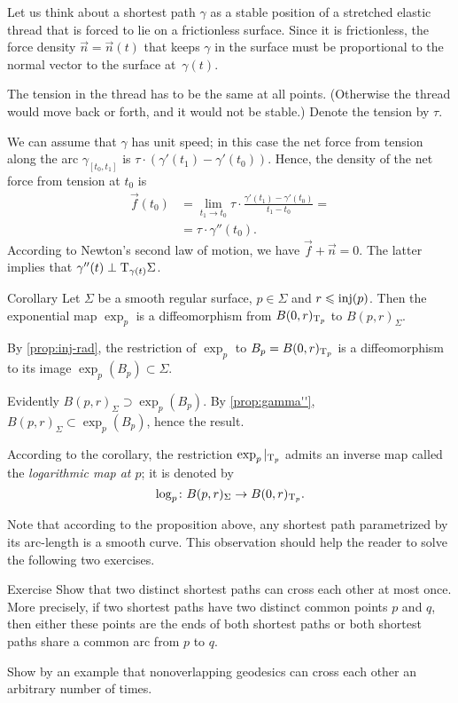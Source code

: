 Let us think about a shortest path $\gamma$ as a stable position of a stretched elastic thread that is forced to lie on a frictionless surface.
Since it is frictionless, the force density $\vec n=\vec n(t)$ that keeps $\gamma$ in the surface must be proportional to the normal vector to the surface at~$\gamma(t)$.

The tension in the thread has to be the same at all points. (Otherwise the thread would move back or forth, and it would not be stable.)
Denote the tension by $\tau$.

We can assume that $\gamma$ has unit speed;
in this case the net force from tension along the arc $\gamma_{[t_0,t_1]}$ is $\tau\cdot(\gamma'(t_1)-\gamma'(t_0))$.
Hence, the density of the net force from tension at $t_0$ is 
\begin{align*}
\vec f(t_0)&=\lim_{t_1\to t_0}\tau\cdot\frac{\gamma'(t_1)-\gamma'(t_0)}{t_1-t_0}=
\\
&=\tau\cdot\gamma''(t_0).
\end{align*}
According to Newton's second law of motion, we have 
$\vec f+\vec n=0$.
The latter implies that $\gamma''(t)\perp\mathrm{T}_{\gamma(t)}\Sigma$.
\qeds

\begin{thm}{Corollary}
Let $\Sigma$ be a smooth regular surface, $p\in\Sigma$ and $r\z\le \inj(p)$.
Then the exponential map $\exp_p$ is a diffeomorphism from $B(0,r)_{\mathrm{T}_p}$ to $B(p,r)_\Sigma$.
\end{thm}

By \ref{prop:inj-rad}, the restriction of $\exp_p$ to $B_p={B(0,r)_{\mathrm{T}_p}}$ is a diffeomorphism to its image $\exp_p(B_p)\subset \Sigma$.

Evidently $B(p,r)_\Sigma\supset\exp_p(B_p)$.
By \ref{prop:gamma''}, $B(p,r)_\Sigma\subset\exp_p(B_p)$, hence the result.
\qeds

According to the corollary, the restriction $\exp_p|_{\mathrm{T}_p}$ admits an inverse map called the \emph{logarithmic map at $p$};
it is denoted by \[\log_p\colon B(p,r)_\Sigma\to B(0,r)_{\mathrm{T}_p}.\]

Note that according to the proposition above, any shortest path parametrized by its arc-length is a smooth curve.
This observation should help the reader to solve the following two exercises.


\begin{thm}{Exercise}\label{ex:two-min-geod}
Show that two distinct shortest paths can cross each other at most once.
More precisely, if two shortest paths have two distinct common points $p$ and $q$, then either these points are the ends of both shortest paths or both shortest paths share a common arc from $p$ to $q$.

Show by an example that nonoverlapping geodesics can cross each other an arbitrary number of times.
\end{thm}

